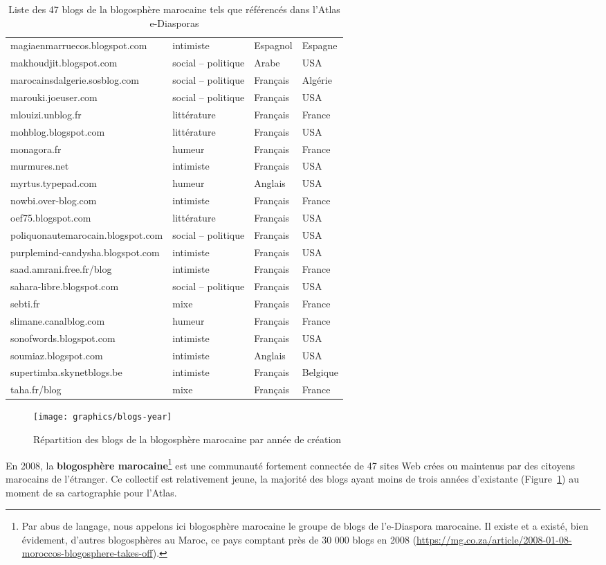 \documentclass[symmetric,justified,marginals=raggedouter]{tufte-book}
\begin{document}
\begin{table*}
\begin{tabular}{llll}
    magiaenmarruecos.blogspot.com&intimiste&Espagnol&Espagne\\ 
    makhoudjit.blogspot.com&social – politique&Arabe&USA\\ 
    marocainsdalgerie.sosblog.com&social – politique&Français&Algérie\\ 
    marouki.joeuser.com&social – politique&Français&USA\\ 
    mlouizi.unblog.fr&littérature&Français&France\\ 
    mohblog.blogspot.com&littérature&Français&USA\\ 
    monagora.fr&humeur&Français&France\\ 
    murmures.net&intimiste&Français&USA\\ 
    myrtus.typepad.com&humeur&Anglais&USA\\ 
    nowbi.over-blog.com&intimiste&Français&France\\ 
    oef75.blogspot.com&littérature&Français&USA\\ 
    poliquonautemarocain.blogspot.com&social – politique&Français&USA\\ 
    purplemind-candysha.blogspot.com&intimiste&Français&USA\\ 
    saad.amrani.free.fr/blog&intimiste&Français&France\\ 
    sahara-libre.blogspot.com&social – politique&Français&USA\\ 
    sebti.fr&mixe&Français&France\\ 
    slimane.canalblog.com&humeur&Français&France\\ 
    sonofwords.blogspot.com&intimiste&Français&USA\\ 
    soumiaz.blogspot.com&intimiste&Anglais&USA\\ 
    supertimba.skynetblogs.be&intimiste&Français&Belgique\\ 
    taha.fr/blog&mixe&Français&France\\ 
  \bottomrule
  \end{tabular}
  \bigskip
  \caption{Liste des 47 blogs de la blogosphère marocaine tels que référencés dans l'Atlas e-Diasporas}
\end{table*}  

\begin{figure}%
  \texttt{[image: graphics/blogs-year]}  
  \caption{Répartition des blogs de la blogosphère marocaine par année de création}
  \label{fig:blogs-years}
\end{figure}

\noindent En 2008, la \textbf{blogosphère marocaine}\footnote{\RaggedOuter Par abus de langage, nous appelons ici blogosphère marocaine le groupe de blogs de l'e-Diaspora marocaine. Il existe et a existé, bien évidement, d'autres blogosphères au Maroc, ce pays comptant près de 30 000 blogs en 2008 (\url{https://mg.co.za/article/2008-01-08-moroccos-blogosphere-takes-off}).} est une communauté fortement connectée de 47 sites Web crées ou maintenus par des citoyens marocains de l'étranger. Ce collectif est relativement jeune, la majorité des blogs ayant moins de trois années d'existante (Figure~\ref{fig:blogs-years}) au moment de sa cartographie pour l'Atlas.
\end{document}
